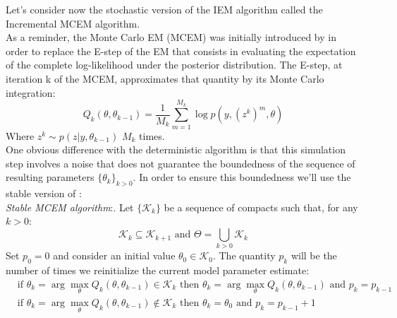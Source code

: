 \documentclass{article}
\theoremstyle{plain}
\theoremstyle{plain}
\theoremstyle{definition}
\begin{document}
Let's consider now the stochastic version of the IEM algorithm called the Incremental MCEM algorithm.\\
As a reminder, the Monte Carlo EM (MCEM) was initially introduced by \citep{wei} in order to replace the E-step of the EM that consists in evaluating the expectation of the complete log-likelihood under the posterior distribution. The E-step, at iteration k of the MCEM, approximates that quantity by its Monte Carlo integration:
\begin{equation}
Q_k(\theta,\theta_{k-1}) = \frac{1}{M_k}\sum_{m=1}^{M_k}{\log p(y,(z^k)^m,\theta)}
\end{equation}
Where $z^k \sim p(z|y,\theta_{k-1})$ $M_k$ times.\\
One obvious difference with the deterministic algorithm is that this simulation step involves a noise that does not guarantee the boundedness of the sequence of resulting parameters $\{\theta_k\}_{k>0}$. In order to ensure this boundedness we'll use the stable version of \citep{chen}:\\ 
\textit{Stable MCEM algorithm}:. Let $\{\mathcal{K}_k\}$ be a sequence of compacts such that, for any $k>0$:
\begin{equation}\label{eq:compact}
\mathcal{K}_k \subseteq \mathcal{K}_{k+1} \textrm{ and } \Theta = \bigcup\limits_{k>0} \mathcal{K}_k
\end{equation}
Set $p_0 = 0$ and consider an initial value $\theta_0 \in \mathcal{K}_{0}$. The quantity $p_k$ will be the number of times we reinitialize the current model parameter estimate:
\begin{equation}\label{eq:init}
\begin{split}
& \textrm{if } \theta_k = \arg\max\limits_{\theta} Q_k(\theta,\theta_{k-1}) \in \mathcal{K}_k \textrm{ then } \theta_k = \arg\max\limits_{\theta} Q_k(\theta,\theta_{k-1}) \textrm{ and } p_k = p_{k-1}\\
& \textrm{if } \theta_k = \arg\max\limits_{\theta} Q_k(\theta,\theta_{k-1}) \notin \mathcal{K}_k \textrm{ then } \theta_k = \theta_0 \textrm{ and } p_k = p_{k-1} + 1
\end{split}
\end{equation}
\end{document}
